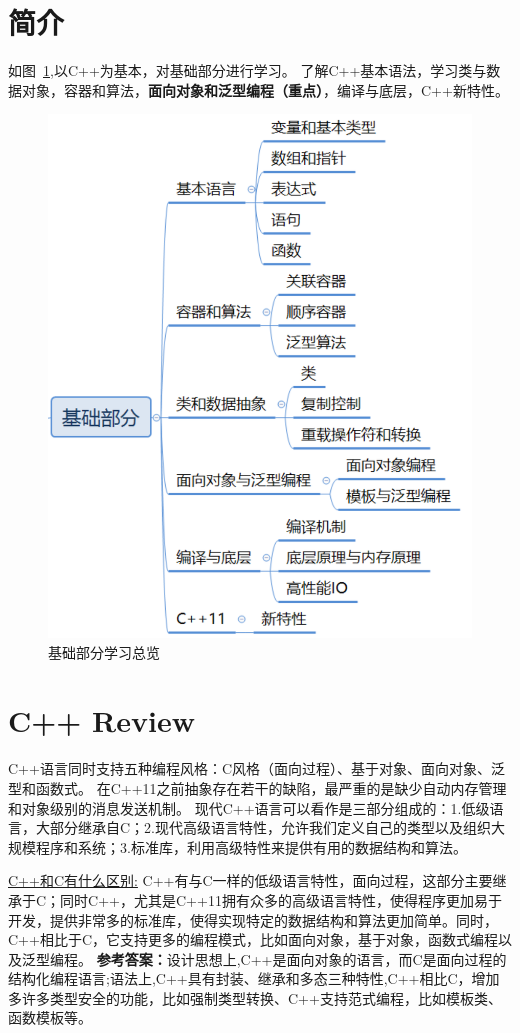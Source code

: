 \section{简介}

如图~\ref{fig:overview},以C++为基本，对基础部分进行学习。
了解C++基本语法，学习类与数据对象，容器和算法，\textbf{面向对象和泛型编程（重点）}，编译与底层，C++新特性。

\begin{figure}[]
	\centering
	\includegraphics[width=0.5\columnwidth]{pic/overview.png}
	\caption{基础部分学习总览}
	\label{fig:overview}
\end{figure}

\section{C++ Review}
C++语言同时支持五种编程风格：C风格（面向过程）、基于对象、面向对象、泛型和函数式。
在C++11之前抽象存在若干的缺陷，最严重的是缺少自动内存管理和对象级别的消息发送机制。
现代C++语言可以看作是三部分组成的：1.低级语言，大部分继承自C；2.现代高级语言特性，允许我们定义自己的类型以及组织大规模程序和系统；3.标准库，利用高级特性来提供有用的数据结构和算法。
\begin{tcolorbox}[boxsep=-0.05in]
	\underline{C++和C有什么区别:} C++有与C一样的低级语言特性，面向过程，这部分主要继承于C；同时C++，尤其是C++11拥有众多的高级语言特性，使得程序更加易于开发，提供非常多的标准库，使得实现特定的数据结构和算法更加简单。同时，C++相比于C，它支持更多的编程模式，比如面向对象，基于对象，函数式编程以及泛型编程。
	\textbf{参考答案：}设计思想上,C++是面向对象的语言，而C是面向过程的结构化编程语言;语法上,C++具有封装、继承和多态三种特性,C++相比C，增加多许多类型安全的功能，比如强制类型转换、C++支持范式编程，比如模板类、函数模板等。
\end{tcolorbox}


